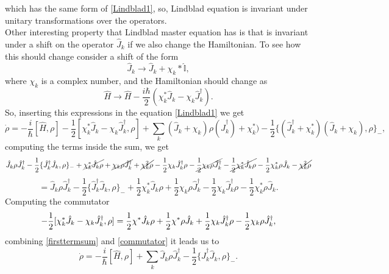 \begin{appendix}
which has the same form of \eqref{Lindblad1}, so, Lindblad equation is invariant under unitary transformations over the operators.\\
Other interesting property that Lindblad master equation has is that is invariant under a shift on the operator $\hat{J}_{k}$ if we also change the Hamiltonian. To see how this should change consider a shift of the form
\[\hat{J}_{k}\rightarrow \hat{J}_{k}+\chi_{k}*\hat{\mathbb{I}},\]
where $\chi_{k}$ is a complex number, and the Hamiltonian should change as
\[\hat{H}\rightarrow \hat{H}-\frac{i\hbar}{2}(\chi^{*}_{k}\hat{J}_{k}-\chi_{k}\hat{J}_{k}^{\dagger}).\]
So, inserting this expressions in the equation \eqref{Lindblad1} we get
\begin{equation*}
\dot{\rho}=-\frac{i}{\hbar}[\hat{H},\rho]-\frac{1}{2}[\chi_{k}^{*}\hat{J}_{k}-\chi_{k}\hat{J}^{\dagger}_{k},\rho]+\sum_{k}(\hat{J}_{k}+\chi_{k})\rho(\hat{J}^{\dagger}_{k})+\chi_{k}^{*})-\frac{1}{2}\{(\hat{J}_{k}^{\dagger}+\chi_{k}^{*})(\hat{J}_{k}+\chi_{k}),\rho\}_{-},
\end{equation*}
computing the terms inside the sum, we get 
\[
\hat{J}_{k}\rho\hat{J}_{k}^{\dagger}-\frac{1}{2}\{\hat{J}_{k}^{\dagger}\hat{J}_{k},\rho\}_{-}+\cancel{\chi^{*}_{k}\hat{J}_{k}\rho}+\cancel{\chi_{k}\rho\hat{J}^{\dagger}_{k}}+\cancel{\chi^{2}_{k}\rho}
-\frac{1}{2}\chi_{k}\hat{J}_{k}^{\dagger}\rho-\cancel{\frac{1}{2}\chi_{k}\rho\hat{J}^{\dagger}_{k}}-\cancel{\frac{1}{2}\chi^{*}_{k}\hat{J}_{k}\rho}
-\frac{1}{2}\chi^{*}_{k}\rho\hat{J}_{k}-\cancel{\chi^{2}_{k}\rho}
\]
\begin{equation}
=\hat{J}_{k}\rho\hat{J}_{k}^{\dagger}-\frac{1}{2}\{\hat{J}_{k}^{\dagger}\hat{J}_{k},\rho\}_{-}+\frac{1}{2}\chi^{*}_{k}\hat{J}_{k}\rho+\frac{1}{2}\chi_{k}\rho\hat{J}^{\dagger}_{k}-\frac{1}{2}\chi_{k}\hat{J}_{k}^{\dagger}\rho-\frac{1}{2}\chi^{*}_{k}\rho\hat{J}_{k}.\label{firsttermsum}
\end{equation}
Computing the commutator
\begin{equation}
-\frac{1}{2}[\chi_{k}^{*}\hat{J}_{k}-\chi_{k}\hat{J}_{k}^{\dagger},\rho]=\-\frac{1}{2}\chi^{*}\hat{J}_{k}\rho+\frac{1}{2}\chi^{*}\rho\hat{J}_{k}+\frac{1}{2}\chi_{k}\hat{J}_{k}^{\dagger}\rho-\frac{1}{2}\chi_{k}\rho\hat{J}_{k}^{\dagger},
\label{commutator}
\end{equation}
combining \eqref{firsttermsum} and \eqref{commutator} it leads us to
\begin{equation}
\dot{\rho}=-\frac{i}{\hbar}[\hat{H},\rho]+\sum_{k}\hat{J}_{k}\rho\hat{J}^{\dagger}_{k}-\frac{1}{2}\{\hat{J}^{\dagger}_{k}\hat{J}_{k},\rho\}_{-}.\label{Lindblad4}

\end{equation}
\end{appendix}
